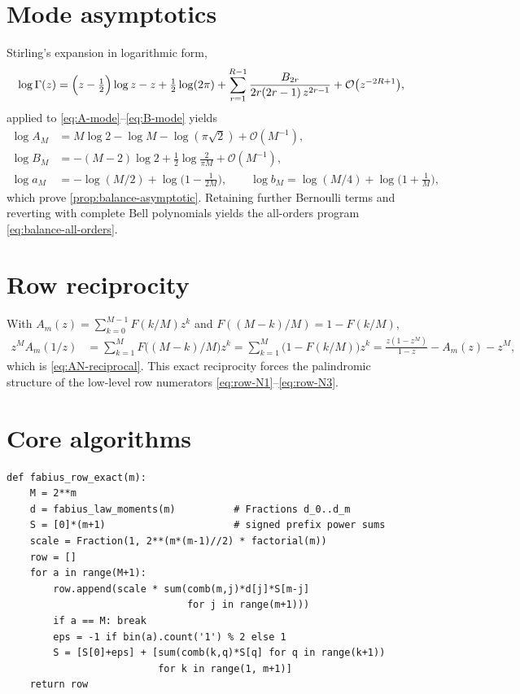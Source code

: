 \documentclass[11pt,oneside]{article}
\numberwithin{equation}{section}
\theoremstyle{definition}
\theoremstyle{remark}
\newcommand{\bigO}{\mathcal O}
\begin{document}
\section{Mode asymptotics}
\label{app:mode-asymptotics}

Stirling's expansion in logarithmic form,
\begin{equation}
 \log\Gamma(z)
 =\Bigl(z-\tfrac12\Bigr)\log z-z+\tfrac12\log(2\pi)
 +\sum_{r=1}^{R-1}\frac{B_{2r}}{2r(2r-1)\,z^{2r-1}}
 +\bigO\bigl(z^{-2R+1}\bigr),
 \label{eq:stirling}
\end{equation}
applied to \eqref{eq:A-mode}--\eqref{eq:B-mode} yields
\begin{align}
 \log A_M&=M\log2-\log M-\log(\pi\sqrt2)+\bigO(M^{-1}),\\
 \log B_M&=-(M-2)\log2+\tfrac12\log\frac{2}{\pi M}+\bigO(M^{-1}),\\
 \log a_M&=-\log(M/2)+\log\bigl(1-\tfrac1{2M}\bigr),
 \qquad
 \log b_M=\log(M/4)+\log\bigl(1+\tfrac1M\bigr),
\end{align}
which prove \cref{prop:balance-asymptotic}.  Retaining further
Bernoulli terms and reverting with complete Bell polynomials yields
the all-orders program \eqref{eq:balance-all-orders}.

\section{Row reciprocity}
\label{app:row-symmetry}

With $A_m(z)=\sum_{k=0}^{M-1}F(k/M)z^{k}$ and
$F((M-k)/M)=1-F(k/M)$,
\begin{align}
 z^{M}A_m(1/z)
 &=\sum_{k=1}^{M}F\bigl((M-k)/M\bigr)z^{k}
 =\sum_{k=1}^{M}\bigl(1-F(k/M)\bigr)z^{k}
 =\frac{z(1-z^{M})}{1-z}-A_m(z)-z^{M},
\end{align}
which is \eqref{eq:AN-reciprocal}.  This exact reciprocity forces the
palindromic structure of the low-level row numerators
\eqref{eq:row-N1}--\eqref{eq:row-N3}.

\section{Core algorithms}
\label{app:algorithms}

\begin{lstlisting}[style=pythonstyle,caption={Streaming the exact
dyadic Fabius row (\cref{alg:stream}); \texttt{d} holds the exact
Fabius-law moments of \eqref{eq:d-recurrence}.}]
def fabius_row_exact(m):
    M = 2**m
    d = fabius_law_moments(m)          # Fractions d_0..d_m
    S = [0]*(m+1)                      # signed prefix power sums
    scale = Fraction(1, 2**(m*(m-1)//2) * factorial(m))
    row = []
    for a in range(M+1):
        row.append(scale * sum(comb(m,j)*d[j]*S[m-j]
                               for j in range(m+1)))
        if a == M: break
        eps = -1 if bin(a).count('1') % 2 else 1
        S = [S[0]+eps] + [sum(comb(k,q)*S[q] for q in range(k+1))
                          for k in range(1, m+1)]
    return row
\end{lstlisting}
\end{document}
